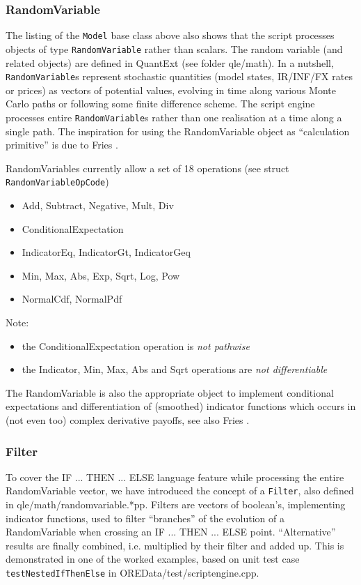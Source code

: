 \documentclass[12pt, a4paper]{report}
\begin{document}
\subsubsection*{RandomVariable}
The listing of the {\tt Model} base class above also shows that the script processes objects
of type {\tt RandomVariable} rather than scalars.
The random variable (and related objects) are defined in QuantExt (see folder qle/math). In a nutshell,
{\tt RandomVariable}s represent stochastic quantities (model states, IR/INF/FX rates or prices) as
vectors of potential values, evolving in time along various Monte Carlo paths or following some finite
difference scheme. The script engine processes entire {\tt RandomVariable}s rather
than one realisation at a time along a single path. The inspiration for using the RandomVariable
object as ``calculation primitive'' is due to Fries \cite{fries_2017_1}.

RandomVariables currently allow a set of 18 operations (see struct {\tt RandomVariableOpCode})
\begin{itemize}
\item Add, Subtract, Negative, Mult, Div
\item ConditionalExpectation
\item IndicatorEq, IndicatorGt, IndicatorGeq
\item Min, Max, Abs, Exp, Sqrt, Log, Pow
\item NormalCdf, NormalPdf
\end{itemize}

Note:
\begin{itemize}
\item the ConditionalExpectation operation is {\em not pathwise}
\item the Indicator, Min, Max, Abs and Sqrt operations are {\em not differentiable}
\end{itemize}

The RandomVariable is also the appropriate object to implement conditional expectations and
differentiation of (smoothed) indicator functions which occurs in (not even too) complex derivative
payoffs, see also Fries \cite{fries_2017_2}.

\subsubsection*{Filter}
To cover the IF ... THEN ... ELSE language feature while processing the entire RandomVariable
vector, we have introduced the concept of a {\tt Filter}, also defined in qle/math/randomvariable.*pp.
Filters are vectors of boolean's, implementing indicator functions, used to filter ``branches''
of the evolution of a RandomVariable when crossing an IF ... THEN ... ELSE point. ``Alternative''
results are finally combined, i.e. multiplied by their filter and added up. This is demonstrated in
one of the worked examples, based on unit test case {\tt testNestedIfThenElse} in
OREData/test/scriptengine.cpp.
\end{document}
